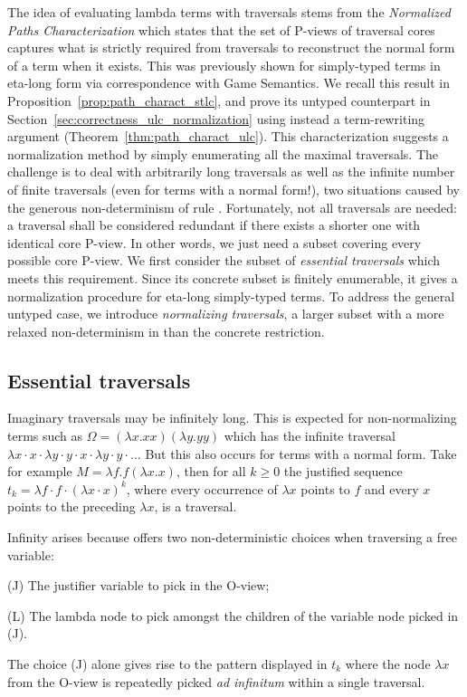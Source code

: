 \documentclass{elsarticle}
\theoremstyle{plain}
\theoremstyle{definition}
\begin{document}
The idea of evaluating lambda terms with traversals stems from the \emph{Normalized Paths Characterization} which states that the set of P-views of traversal cores captures what is strictly required from traversals to reconstruct the normal form of a term when it exists.
This was previously shown for simply-typed terms in eta-long form via
correspondence with Game Semantics.
We recall this result
in Proposition~\ref{prop:path_charact_stlc},
and prove its untyped counterpart in
Section~\ref{sec:correctness_ulc_normalization} using instead a term-rewriting argument (Theorem~\ref{thm:path_charact_ulc}).
This characterization suggests a normalization method by simply enumerating all the maximal traversals.
The challenge is to deal with arbitrarily long traversals as well as the infinite number of finite traversals (even for terms with a normal form!),
two situations caused by the generous non-determinism of rule .
%
Fortunately, not all traversals are needed: a traversal shall be considered redundant if there exists a shorter one with identical core P-view.
In other words, we just need a subset covering
every possible core P-view.
%
We first consider the subset of \emph{essential traversals} which
meets this requirement.
Since its concrete subset is finitely enumerable, it gives
a normalization procedure for eta-long simply-typed terms.
To address the general untyped case,
we introduce \emph{normalizing traversals}, a larger subset
with a more relaxed non-determinism in  than the concrete restriction.

\subsection{Essential traversals}

Imaginary traversals may be infinitely long.
This is expected for non-normalizing terms such as $\Omega = (\lambda x. x x)(\lambda y. y y)$ which has the infinite traversal $\lambda x \cdot x \cdot \lambda y \cdot y \cdot x \cdot \lambda y \cdot y \cdot \ldots$ But this also occurs for terms with a normal form. Take for example $M = \lambda f . f (\lambda x. x)$, then for all $k\geq0$ the justified sequence $t_k = \lambda f \cdot f \cdot (\lambda x \cdot  x)^k$, where every occurrence of $\lambda x$ points to $f$ and every $x$ points to the preceding $\lambda x$, is a traversal.

Infinity arises because  offers two non-deterministic choices when traversing a free variable:
\begin{compactitem}
\item[(J)] The justifier variable to pick in the O-view;
\item[(L)] The lambda node to pick amongst the children of the variable node picked in (J).
\end{compactitem}
The choice (J) alone gives rise to the pattern displayed in $t_k$ where the node $\lambda x$ from the O-view is repeatedly picked {\it ad infinitum} within a single traversal.
\end{document}
